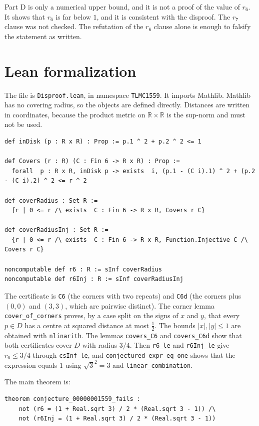 \documentclass[11pt]{article}
\theoremstyle{definition}
\theoremstyle{plain}
\begin{document}
Part D is only a numerical upper bound, and it is not a proof of the value of $r_6$. It shows that $r_6$ is far below $1$, and it is consistent with the disproof. The $r_7$ clause was not checked. The refutation of the $r_6$ clause alone is enough to falsify the statement as written.

\section{Lean formalization}
\label{sec:lean}

The file is \texttt{Disproof.lean}, in namespace \texttt{TLMC1559}. It imports Mathlib. Mathlib has no covering radius, so the objects are defined directly. Distances are written in coordinates, because the product metric on $\mathbb{R}\times\mathbb{R}$ is the sup-norm and must not be used.

\begin{lstlisting}
def inDisk (p : R x R) : Prop := p.1 ^ 2 + p.2 ^ 2 <= 1

def Covers (r : R) (C : Fin 6 -> R x R) : Prop :=
  forall  p : R x R, inDisk p -> exists  i, (p.1 - (C i).1) ^ 2 + (p.2 - (C i).2) ^ 2 <= r ^ 2

def coverRadius : Set R :=
  {r | 0 <= r /\ exists  C : Fin 6 -> R x R, Covers r C}

def coverRadiusInj : Set R :=
  {r | 0 <= r /\ exists  C : Fin 6 -> R x R, Function.Injective C /\ Covers r C}

noncomputable def r6 : R := sInf coverRadius
noncomputable def r6Inj : R := sInf coverRadiusInj
\end{lstlisting}

The certificate is \texttt{C6} (the corners with two repeats) and \texttt{C6d} (the corners plus $(0,0)$ and $(3,3)$, which are pairwise distinct). The corner lemma \texttt{cover\_of\_corners} proves, by a case split on the signs of $x$ and $y$, that every $p\in D$ has a centre at squared distance at most $\tfrac12$. The bounds $|x|,|y|\le 1$ are obtained with \texttt{nlinarith}. The lemmas \texttt{covers\_C6} and \texttt{covers\_C6d} show that both certificates cover $D$ with radius $3/4$. Then \texttt{r6\_le} and \texttt{r6Inj\_le} give $r_6\le 3/4$ through \texttt{csInf\_le}, and \texttt{conjectured\_expr\_eq\_one} shows that the expression equals $1$ using $\sqrt3^2=3$ and \texttt{linear\_combination}.

The main theorem is:

\begin{lstlisting}
theorem conjecture_00000001559_fails :
    not (r6 = (1 + Real.sqrt 3) / 2 * (Real.sqrt 3 - 1)) /\
    not (r6Inj = (1 + Real.sqrt 3) / 2 * (Real.sqrt 3 - 1))
\end{lstlisting}
\end{document}
